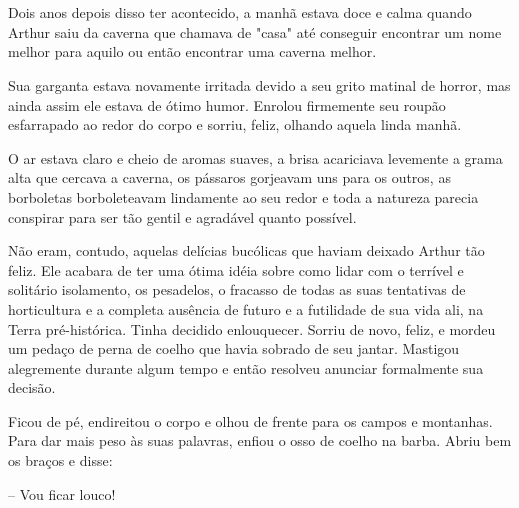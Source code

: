 \documentclass[eps,11pt]{book}
\begin{document}
\chapter{}

Dois anos depois disso ter acontecido, a manhã estava doce e calma quando Arthur saiu da caverna que chamava de "casa" até conseguir encontrar um nome melhor para aquilo ou então encontrar uma caverna melhor.

Sua garganta estava novamente irritada devido a seu grito matinal de horror, mas ainda assim ele estava de ótimo humor. Enrolou firmemente seu roupão esfarrapado ao redor do corpo e sorriu, feliz, olhando aquela linda manhã.

O ar estava claro e cheio de aromas suaves, a brisa acariciava levemente a grama alta que cercava a caverna, os pássaros gorjeavam uns para os outros, as borboletas borboleteavam lindamente ao seu redor e toda a natureza parecia conspirar para ser tão gentil e agradável quanto possível.

Não eram, contudo, aquelas delícias bucólicas que haviam deixado Arthur tão feliz. Ele acabara de ter uma ótima idéia sobre como lidar com o terrível e solitário isolamento, os pesadelos, o fracasso de todas as suas tentativas de horticultura e a completa ausência de futuro e a futilidade de sua vida ali, na Terra pré-histórica. Tinha decidido enlouquecer.
Sorriu de novo, feliz, e mordeu um pedaço de perna de coelho que havia sobrado de seu jantar. Mastigou alegremente durante algum tempo e então resolveu anunciar formalmente sua decisão.

Ficou de pé, endireitou o corpo e olhou de frente para os campos e montanhas. Para dar mais peso às suas palavras, enfiou o osso de coelho na barba. Abriu bem os braços e disse:

-- Vou ficar louco!
\end{document}
